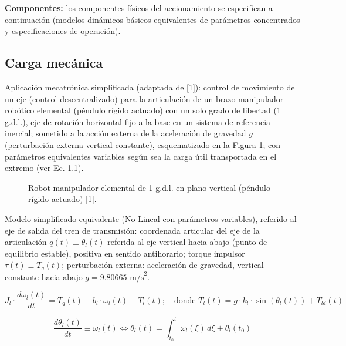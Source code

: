 \documentclass[11pt,a4paper]{article}
\begin{document}
\textbf{Componentes:} los componentes físicos del accionamiento se especifican a continuación (modelos dinámicos básicos equivalentes de parámetros concentrados y especificaciones de operación).

\subsection*{Carga mecánica}
Aplicación mecatrónica simplificada (adaptada de [1]): control de movimiento de un eje (control descentralizado) para la articulación de un brazo manipulador robótico elemental (péndulo rígido actuado) con un solo grado de libertad (1 g.d.l.), eje de rotación horizontal fijo a la base en un sistema de referencia inercial; sometido a la acción externa de la aceleración de gravedad $g$ (perturbación externa vertical constante), esquematizado en la Figura 1; con parámetros equivalentes variables según sea la carga útil transportada en el extremo (ver Ec. 1.1).

\begin{figure}[H]
    \centering
    \fbox{\rule{0pt}{3cm} \rule{0.8\textwidth}{0pt}}
    \caption{Robot manipulador elemental de 1 g.d.l. en plano vertical (péndulo rígido actuado) [1].}
\end{figure}

Modelo simplificado equivalente (No Lineal con parámetros variables), referido al eje de salida del tren de transmisión: coordenada articular del eje de la articulación $q(t) \equiv \theta_{l}(t)$ referida al eje vertical hacia abajo (punto de equilibrio estable), positiva en sentido antihorario; torque impulsor $\tau(t) \equiv T_{q}(t)$; perturbación externa: aceleración de gravedad, vertical constante hacia abajo $g = 9.80665 \text{ m/s}^2$.

\begin{equation}
J_{l} \cdot \frac{d\omega_{l}(t)}{dt} = T_{q}(t) - b_{l} \cdot \omega_{l}(t) - T_{l}(t); \quad \text{donde } T_{l}(t) = g \cdot k_l \cdot \sin(\theta_{l}(t)) + T_{ld}(t) \tag{Ec. 1.1}
\end{equation}

\begin{equation}
\frac{d\theta_{l}(t)}{dt} \equiv \omega_{l}(t) \Leftrightarrow \theta_{l}(t) = \int_{t_{0}}^{t} \omega_{l}(\xi) \, d\xi + \theta_{l}(t_{0}) \tag{Ec. 1.2}
\end{equation}
\end{document}
